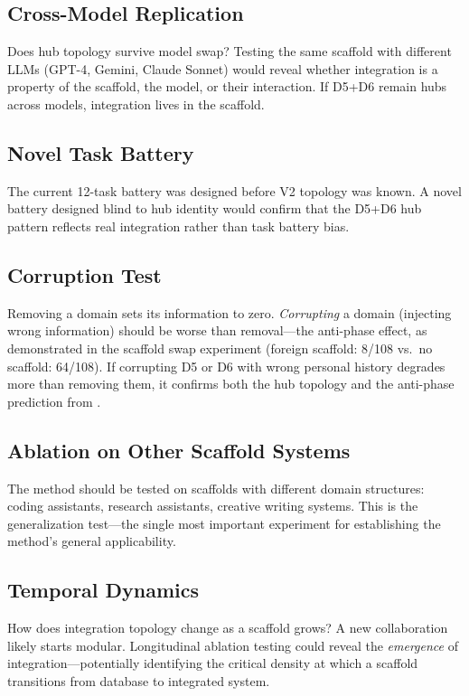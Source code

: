 \documentclass[12pt,letterpaper]{article}
\begin{document}
\subsection{Cross-Model Replication}

Does hub topology survive model swap? Testing the same scaffold with different LLMs (GPT-4, Gemini, Claude Sonnet) would reveal whether integration is a property of the scaffold, the model, or their interaction. If D5+D6 remain hubs across models, integration lives in the scaffold.

\subsection{Novel Task Battery}

The current 12-task battery was designed before V2 topology was known. A novel battery designed blind to hub identity would confirm that the D5+D6 hub pattern reflects real integration rather than task battery bias.

\subsection{Corruption Test}

Removing a domain sets its information to zero. \emph{Corrupting} a domain (injecting wrong information) should be worse than removal---the anti-phase effect, as demonstrated in the scaffold swap experiment (foreign scaffold: 8/108 vs.\ no scaffold: 64/108). If corrupting D5 or D6 with wrong personal history degrades more than removing them, it confirms both the hub topology and the anti-phase prediction from \citet{khushiyant2025stigmergic}.

\subsection{Ablation on Other Scaffold Systems}

The method should be tested on scaffolds with different domain structures: coding assistants, research assistants, creative writing systems. This is the generalization test---the single most important experiment for establishing the method's general applicability.

\subsection{Temporal Dynamics}

How does integration topology change as a scaffold grows? A new collaboration likely starts modular. Longitudinal ablation testing could reveal the \emph{emergence} of integration---potentially identifying the critical density at which a scaffold transitions from database to integrated system.
\end{document}
